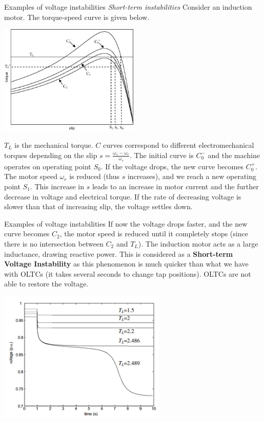 \begin{frame} {Examples of voltage instabilities}
\emph{Short-term instabilities}
Consider an induction motor. The torque-speed curve is given below.
\begin{center}
\includegraphics[width=0.5\textwidth]{images/Motorstalling.png}
\end{center}
$T_L$ is the mechanical torque. $C$ curves correspond to different electromechanical torques depending on the slip $s=\frac{\omega_s - \omega_r}{\omega_s}$.
The initial curve is $C_0^-$ and the machine operates on operating point $S_0$. If the voltage drops, the new curve becomes $C_0^+$.
The motor speed $\omega_r$ is reduced (thus $s$ increases), and we reach a new operating point $S_1$. This increase in $s$ leads to an increase in motor current and the further decrease in voltage and electrical torque. If the rate of decreasing voltage is slower than that of increasing slip, the voltage settles down.
\end{frame}

\begin{frame} {Examples of voltage instabilities}
If now the voltage drops faster, and the new curve becomes $C_2$, the motor speed is reduced until it completely stops (since there is no intersection between $C_2$ and $T_L$). The induction motor acts as a large inductance, drawing reactive power.
This is considered as a \textbf{Short-term Voltage Instability} as this phenomenon is much quicker than what we have with OLTCs (it takes several seconds to change tap positions). OLTCs are not able to restore the voltage.
\begin{center}
\includegraphics[width=0.6\textwidth]{images/InductionMotorVoltage.png}
\end{center}
\end{frame}




